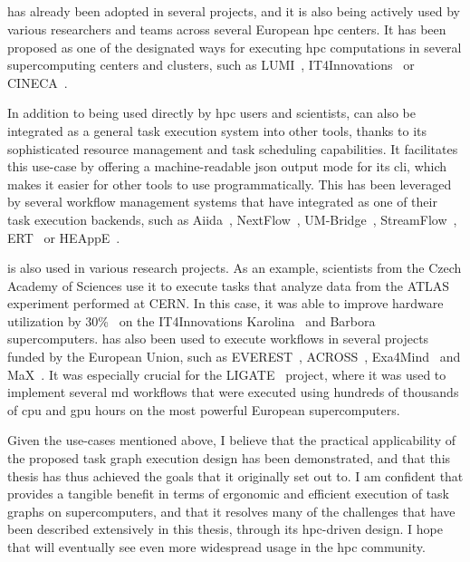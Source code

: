 \subsection*{\hyperqueue{}}
\hyperqueue{} has already been adopted in several projects, and it is also being
actively used by various researchers and teams across several European \gls{hpc}
centers. It has been proposed as one of the designated ways for executing
\gls{hpc} computations in several supercomputing centers and clusters, such as
LUMI~\cite{it4i-lumi}, IT4Innovations~\cite{it4i-hq} or
CINECA~\cite{cineca}.

In addition to being used directly by \gls{hpc} users and scientists, \hyperqueue{} can also
be integrated as a general task execution system into other tools, thanks to its sophisticated
resource management and task scheduling capabilities. It facilitates this use-case by offering a
machine-readable \gls{json} output mode for its \gls{cli}, which
makes it easier for other tools to use \hyperqueue{} programmatically. This has been
leveraged by several workflow management systems that have integrated \hyperqueue{} as
one of their task execution backends, such as Aiida~\cite{aiida-hq},
NextFlow~\cite{nextflow-hq}, UM-Bridge~\cite{umbridge},
StreamFlow~\cite{streamflow-hq}, ERT~\cite{ert} or
HEAppE~\cite{heappe}.

\hyperqueue{} is also used in various research projects. As an example,
scientists from the Czech Academy of Sciences use it to execute tasks that analyze data from the
ATLAS~\cite{atlas} experiment performed at CERN. In this case, it was able to improve
hardware utilization by 30\%~\cite{cern-hq} on the IT4Innovations Karolina~\cite{karolina} and
Barbora~\cite{barbora} supercomputers. \hyperqueue{} has also been used to execute workflows in several projects
funded by the European Union, such as EVEREST~\cite{everest},
ACROSS~\cite{across}, Exa4Mind~\cite{exa4mind} and
MaX~\cite{max}. It was especially crucial for the LIGATE~\cite{ligate}
project, where it was used to implement several \gls{md} workflows that were
executed using hundreds of thousands of \gls{cpu} and \gls{gpu}
hours on the most powerful European supercomputers.

Given the use-cases mentioned above, I believe that the practical applicability of the proposed
task graph execution design has been demonstrated, and that this thesis has thus achieved the goals
that it originally set out to. I am confident that \hyperqueue{} provides a tangible
benefit in terms of ergonomic and efficient execution of task graphs on supercomputers, and that
it resolves many of the challenges that have been described extensively in this thesis, through its
\gls{hpc}-driven design. I hope that \hyperqueue{} will eventually
see even more widespread usage in the \gls{hpc} community.
